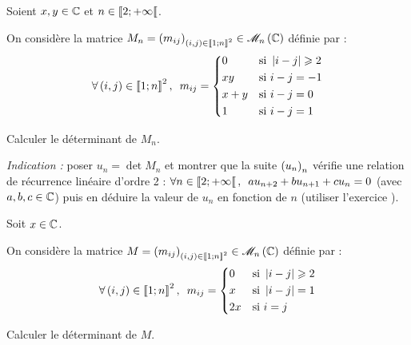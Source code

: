 \begin{corr}
\end{corr}

\begin{exo}
Soient \(x,y\in\mathbb{C}\) et \(n\in\left\llbracket2;+\infty\right\llbracket\).

On considère la matrice \(M_n=\paren{m_{ij}}_{\paren{i,j}\in\interventierii{1}{n}^2}\in\M{n}[\C]\) définie par : \[\quantifs{\forall\paren{i,j}\in\interventierii{1}{n}^2}m_{ij}=\begin{dcases}
0 &\text{si }\abs{i-j}\geq2 \\
xy &\text{si }i-j=-1 \\
x+y &\text{si }i-j=0 \\
1 &\text{si }i-j=1
\end{dcases}\]

Calculer le déterminant de \(M_n\).

\textit{Indication :} poser \(u_n=\det M_n\) et montrer que la suite \(\left(u_n\right)_n\) vérifie une relation de récurrence linéaire d'ordre 2 : \(\quantifs{\forall n\in\interventierie{2}{\pinf}}au_{n+2}+bu_{n+1}+cu_n=0\) (avec \(a,b,c\in\mathbb{C}\)) puis en déduire la valeur de \(u_n\) en fonction de \(n\) (utiliser l'exercice ).
\end{exo}

\begin{corr}
\end{corr}

\begin{exo}[Exercice 14]
Soit \(x\in\mathbb{C}\).

On considère la matrice \(M=\paren{m_{ij}}_{\paren{i,j}\in\interventierii{1}{n}^2}\in\M{n}[\C]\) définie par : \[\quantifs{\forall\paren{i,j}\in\interventierii{1}{n}^2}m_{ij}=\begin{dcases}
0 &\text{si }\abs{i-j}\geq2 \\
x &\text{si }\abs{i-j}=1 \\
2x &\text{si }i=j
\end{dcases}\]

Calculer le déterminant de \(M\).
\end{exo}

\begin{corr}
\end{corr}

